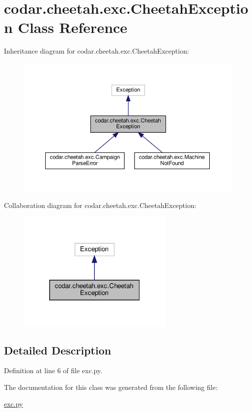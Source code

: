 \hypertarget{classcodar_1_1cheetah_1_1exc_1_1_cheetah_exception}{}\section{codar.\+cheetah.\+exc.\+Cheetah\+Exception Class Reference}
\label{classcodar_1_1cheetah_1_1exc_1_1_cheetah_exception}


Inheritance diagram for codar.\+cheetah.\+exc.\+Cheetah\+Exception\+:
\nopagebreak
\begin{figure}[H]
\begin{center}
\leavevmode
\includegraphics[width=350pt]{classcodar_1_1cheetah_1_1exc_1_1_cheetah_exception__inherit__graph}
\end{center}
\end{figure}


Collaboration diagram for codar.\+cheetah.\+exc.\+Cheetah\+Exception\+:
\nopagebreak
\begin{figure}[H]
\begin{center}
\leavevmode
\includegraphics[width=217pt]{classcodar_1_1cheetah_1_1exc_1_1_cheetah_exception__coll__graph}
\end{center}
\end{figure}


\subsection{Detailed Description}


Definition at line 6 of file exc.\+py.



The documentation for this class was generated from the following file\+:\begin{DoxyCompactItemize}
\item 
\hyperlink{exc_8py}{exc.\+py}\end{DoxyCompactItemize}
